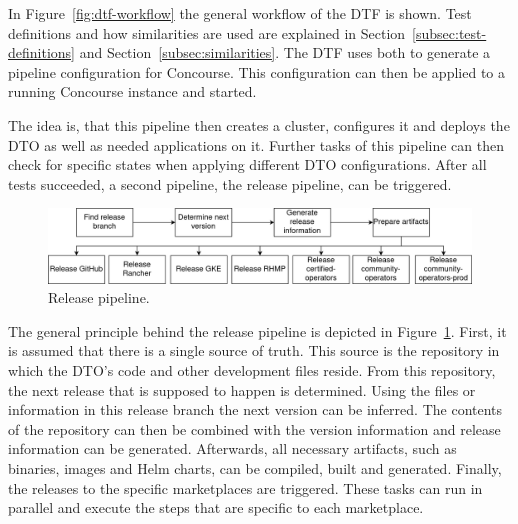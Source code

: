 In Figure~\ref{fig:dtf-workflow} the general workflow of the DTF is shown.
Test definitions and how similarities are used are explained in Section~\ref{subsec:test-definitions} and Section~\ref{subsec:similarities}.
The DTF uses both to generate a pipeline configuration for Concourse.
This configuration can then be applied to a running Concourse instance and started.

The idea is, that this pipeline then creates a cluster, configures it and deploys the DTO as well as needed applications on it.
Further tasks of this pipeline can then check for specific states when applying different DTO configurations.
After all tests succeeded, a second pipeline, the release pipeline, can be triggered.

\begin{figure}[H]
    \centering
    \includegraphics[width=\textwidth]{img/context/release pipeline}
    \caption{Release pipeline.}
    \label{fig:release-pipeline}
\end{figure}

The general principle behind the release pipeline is depicted in Figure~\ref{fig:release-pipeline}.
First, it is assumed that there is a single source of truth.
This source is the repository in which the DTO's code and other development files reside.
From this repository, the next release that is supposed to happen is determined.
Using the files or information in this release branch the next version can be inferred.
The contents of the repository can then be combined with the version information and release information can be generated.
Afterwards, all necessary artifacts, such as binaries, images and Helm charts, can be compiled, built and generated.
Finally, the releases to the specific marketplaces are triggered.
These tasks can run in parallel and execute the steps that are specific to each marketplace.
